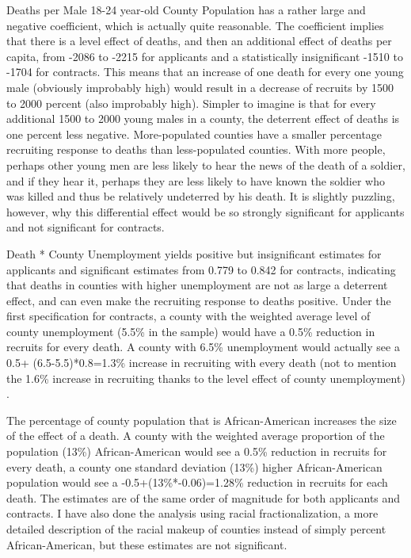 \documentclass[12pt] {article}
\begin{document}
Deaths per Male 18-24 year-old County Population has a rather large
and negative coefficient, which is actually quite reasonable. The coefficient implies that there is a level effect of deaths, and then an additional effect of deaths per
capita, from -2086 to -2215 for applicants and a statistically insignificant
-1510 to -1704 for contracts. This means that an increase of one death
for every one young male (obviously improbably high) would result
in a decrease of recruits by 1500 to 2000 percent (also improbably
high). Simpler to imagine is that for every additional 1500 to 2000
young males in a county, the deterrent effect of deaths is one percent
less negative. More-populated counties have a smaller percentage
recruiting response to deaths than less-populated counties. With more
people, perhaps other young men are less likely to hear the news of
the death of a soldier, and if they hear it, perhaps they are less
likely to have known the soldier who was killed and thus be relatively
undeterred by his death. It is slightly puzzling, however, why this
differential effect would be so strongly significant for applicants
and not significant for contracts. 

Death {*} County Unemployment yields positive but insignificant estimates
for applicants and significant estimates from 0.779 to 0.842 for contracts,
indicating that deaths in counties with higher unemployment are not
as large a deterrent effect, and can even make the recruiting response
to deaths positive. Under the first specification for contracts, a
county with the weighted average level of county unemployment (5.5\%
in the sample) would have a 0.5\% reduction in recruits for every
death. A county with 6.5\% unemployment would actually see a 0.5+ (6.5-5.5)*0.8=1.3\%
increase in recruiting with every death (not to mention the 1.6\%
increase in recruiting thanks to the level effect of county unemployment) . 

The percentage of county population that is African-American increases
the size of the effect of a death. A county with the weighted average
proportion of the population (13\%) African-American would see a 0.5\%
reduction in recruits for every death, a county one standard deviation
(13\%) higher African-American population would see a -0.5+(13\%{*}-0.06)=1.28\%
reduction in recruits for each death. The estimates are of the same
order of magnitude for both applicants and contracts. I have also
done the analysis using racial fractionalization, a more detailed description of the racial
makeup of counties instead of simply percent African-American, but these estimates are not significant.
\end{document}
